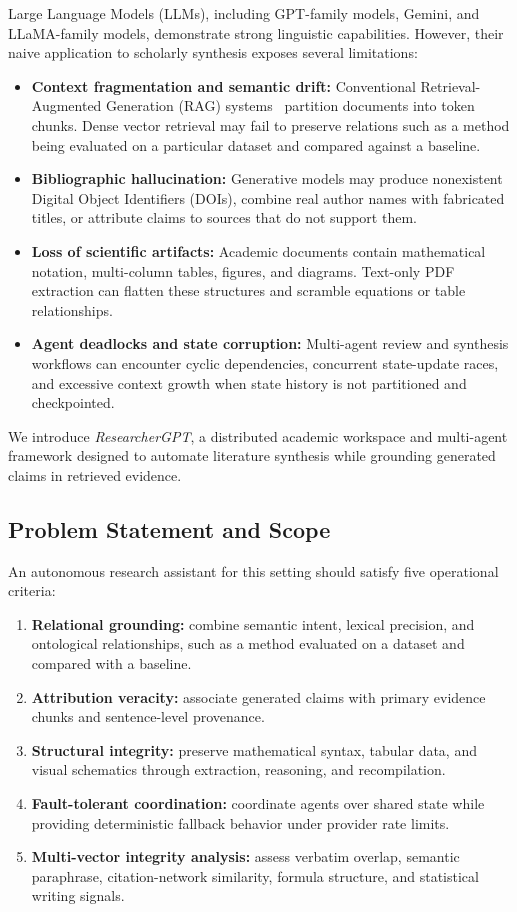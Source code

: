 \documentclass[conference]{IEEEtran}
\begin{document}
Large Language Models (LLMs), including GPT-family models, Gemini, and LLaMA-family models, demonstrate strong linguistic capabilities. However, their naive application to scholarly synthesis exposes several limitations:
\begin{itemize}
\item \textbf{Context fragmentation and semantic drift:} Conventional Retrieval-Augmented Generation (RAG) systems~\cite{lewis2020rag} partition documents into token chunks. Dense vector retrieval may fail to preserve relations such as a method being evaluated on a particular dataset and compared against a baseline.
\item \textbf{Bibliographic hallucination:} Generative models may produce nonexistent Digital Object Identifiers (DOIs), combine real author names with fabricated titles, or attribute claims to sources that do not support them.
\item \textbf{Loss of scientific artifacts:} Academic documents contain mathematical notation, multi-column tables, figures, and diagrams. Text-only PDF extraction can flatten these structures and scramble equations or table relationships.
\item \textbf{Agent deadlocks and state corruption:} Multi-agent review and synthesis workflows can encounter cyclic dependencies, concurrent state-update races, and excessive context growth when state history is not partitioned and checkpointed.
\end{itemize}

We introduce \textit{ResearcherGPT}, a distributed academic workspace and multi-agent framework designed to automate literature synthesis while grounding generated claims in retrieved evidence.

\subsection{Problem Statement and Scope}
An autonomous research assistant for this setting should satisfy five operational criteria:
\begin{enumerate}
\item \textbf{Relational grounding:} combine semantic intent, lexical precision, and ontological relationships, such as a method evaluated on a dataset and compared with a baseline.
\item \textbf{Attribution veracity:} associate generated claims with primary evidence chunks and sentence-level provenance.
\item \textbf{Structural integrity:} preserve mathematical syntax, tabular data, and visual schematics through extraction, reasoning, and recompilation.
\item \textbf{Fault-tolerant coordination:} coordinate agents over shared state while providing deterministic fallback behavior under provider rate limits.
\item \textbf{Multi-vector integrity analysis:} assess verbatim overlap, semantic paraphrase, citation-network similarity, formula structure, and statistical writing signals.
\end{enumerate}
\end{document}
